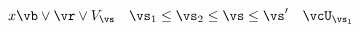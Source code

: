 \documentclass[10pt]{scrartcl}
\begin{document}
\makeatletter
\[
    x
    \vb\lor\vr\lor V_\vs \quad \vs_1 \le \vs_2 \le \vs \le \vs' \quad \vcU_{\vs_1}
\]
\ExplSyntaxOn
\end{document}
